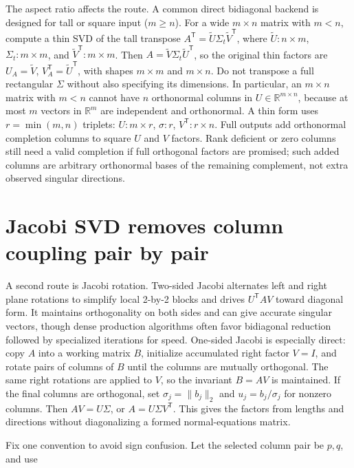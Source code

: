 The aspect ratio affects the route. A common direct bidiagonal backend is designed for tall or square input (\(m\ge n\)). For a wide \(m\times n\) matrix with \(m<n\), compute a thin SVD of the tall transpose \(A^\mathsf T=\tilde U\Sigma_t\tilde V^\mathsf T\), where \(\tilde U:n\times m\), \(\Sigma_t:m\times m\), and \(\tilde V^\mathsf T:m\times m\). Then \(A=\tilde V\Sigma_t\tilde U^\mathsf T\), so the original thin factors are \(U_A=\tilde V\), \(V_A^\mathsf T=\tilde U^\mathsf T\), with shapes \(m\times m\) and \(m\times n\). Do not transpose a full rectangular \(\Sigma\) without also specifying its dimensions. In particular, an \(m\times n\) matrix with \(m<n\) cannot have \(n\) orthonormal columns in \(U\in\mathbb R^{m\times n}\), because at most \(m\) vectors in \(\mathbb R^m\) are independent and orthonormal. A thin form uses \(r=\min(m,n)\) triplets: \(U:m\times r\), \(\sigma:r\), \(V^\mathsf T:r\times n\). Full outputs add orthonormal completion columns to square \(U\) and \(V\) factors. Rank deficient or zero columns still need a valid completion if full orthogonal factors are promised; such added columns are arbitrary orthonormal bases of the remaining complement, not extra observed singular directions.

\section{Jacobi SVD removes column coupling pair by pair}\label{02-foundations-ii-ch038-jacobi-svd-removes-column-coupling-pair-by-pair}

A second route is Jacobi rotation. Two-sided Jacobi alternates left and right plane rotations to simplify local 2-by-2 blocks and drives \(U^\mathsf TAV\) toward diagonal form. It maintains orthogonality on both sides and can give accurate singular vectors, though dense production algorithms often favor bidiagonal reduction followed by specialized iterations for speed. One-sided Jacobi is especially direct: copy \(A\) into a working matrix \(B\), initialize accumulated right factor \(V=I\), and rotate pairs of columns of \(B\) until the columns are mutually orthogonal. The same right rotations are applied to \(V\), so the invariant \(B=AV\) is maintained. If the final columns are orthogonal, set \(\sigma_j=\|b_j\|_2\) and \(u_j=b_j/\sigma_j\) for nonzero columns. Then \(AV=U\Sigma\), or \(A=U\Sigma V^\mathsf T\). This gives the factors from lengths and directions without diagonalizing a formed normal-equations matrix.

Fix one convention to avoid sign confusion. Let the selected column pair be \(p,q\), and use

